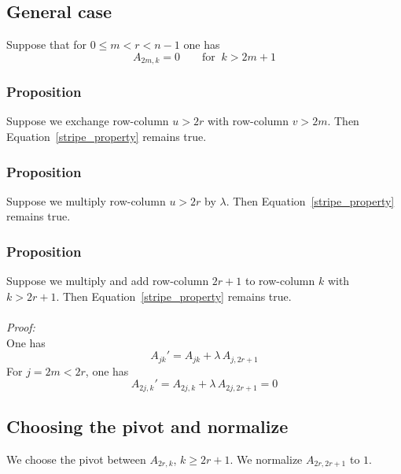\documentclass{article}
\begin{document}
\subsection{General case}
Suppose that for $0\le m<r< n-1$ one has
\begin{equation}\label{stripe_property}
A_{2m, k} = 0 \qquad \text{for}\;\; k>2m+1 
\end{equation}
\subsubsection{Proposition}
Suppose we exchange row-column $u>2r$ with row-column $v>2m$. Then Equation~\eqref{stripe_property} remains true.
\subsubsection{Proposition}
Suppose we multiply row-column $u>2r$ by $\lambda$. Then Equation~\eqref{stripe_property} remains true.
\subsubsection{Proposition}
Suppose we multiply and add row-column $2r+1$ to row-column $k$ with $k>2r+1$. Then Equation~\eqref{stripe_property} remains true.\\ \\
{\it Proof:}\\
One has
$$
A_{jk}' = A_{jk} + \lambda\, A_{j,2r+1}
$$
For $j=2m < 2r$, one has
$$
A_{2j,k}' = A_{2j,k}+\lambda \, A_{2j, 2r+1} = 0
$$
\subsection{Choosing the pivot and normalize}
We choose the pivot between $A_{2r,k}$, $k\ge 2r+1$. We normalize $A_{2r, 2r+1}$ to $1$.
\end{document}
